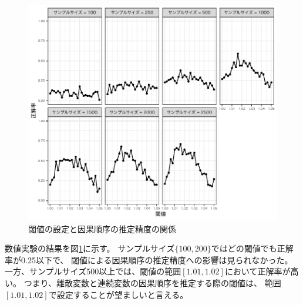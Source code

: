\begin{figure}
  \includegraphics[width=13cm, bb=9 9 358 434]{./picture/plot_threshold.pdf}
  \caption{閾値の設定と因果順序の推定精度の関係}
  \label{fig:plot_threshold}
\end{figure}

数値実験の結果を図\ref{fig:plot_threshold}に示す。
サンプルサイズ$\{ 100, 200 \}$ではどの閾値でも正解率が0.25以下で、
閾値による因果順序の推定精度への影響は見られなかった。
一方、サンプルサイズ500以上では、閾値の範囲$[1.01, 1.02]$において正解率が高い。
つまり、離散変数と連続変数の因果順序を推定する際の閾値は、
範囲$[1.01, 1.02]$で設定することが望ましいと言える。
